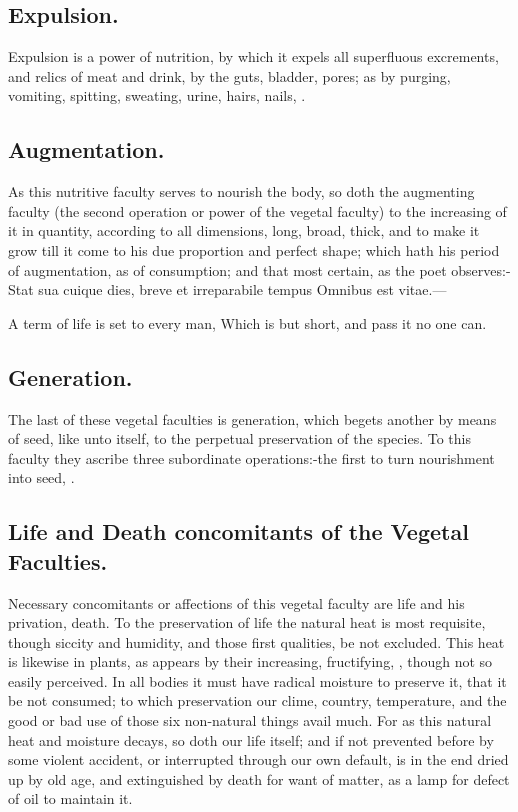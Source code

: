 {\subsection{Expulsion.}
Expulsion is a power of nutrition, by which it expels all
superfluous excrements, and relics of meat and drink, by the guts,
bladder, pores; as by purging, vomiting, spitting, sweating, urine,
hairs, nails, \etc{}.
\subsection{Augmentation.}
As this nutritive faculty serves to nourish the body,
so doth the augmenting faculty (the second operation or power of the
vegetal faculty) to the increasing of it in quantity, according to all
dimensions, long, broad, thick, and to make it grow till it come to his
due proportion and perfect shape; which hath his period of
augmentation, as of consumption; and that most certain, as the poet
observes:-
Stat sua cuique dies, breve et irreparabile tempus
Omnibus est vitae.---

A term of life is set to every man,
Which is but short, and pass it no one can.

\subsection{Generation.}
The last of these vegetal faculties is generation, which
begets another by means of seed, like unto itself, to the perpetual
preservation of the species. To this faculty they ascribe three
subordinate operations:-the first to turn nourishment into seed, \etc{}.

\subsection{Life and Death concomitants of the Vegetal Faculties.}
Necessary concomitants or affections of this vegetal faculty are life and his
privation, death. To the preservation of life the natural heat is most
requisite, though siccity and humidity, and those first qualities, be
not excluded. This heat is likewise in plants, as appears by their
increasing, fructifying, \etc{}, though not so easily perceived. In all
bodies it must have radical moisture to preserve it, that it be
not consumed; to which preservation our clime, country, temperature,
and the good or bad use of those six non-natural things avail much. For
as this natural heat and moisture decays, so doth our life itself; and
if not prevented before by some violent accident, or interrupted
through our own default, is in the end dried up by old age, and
extinguished by death for want of matter, as a lamp for defect of oil
to maintain it.

}
